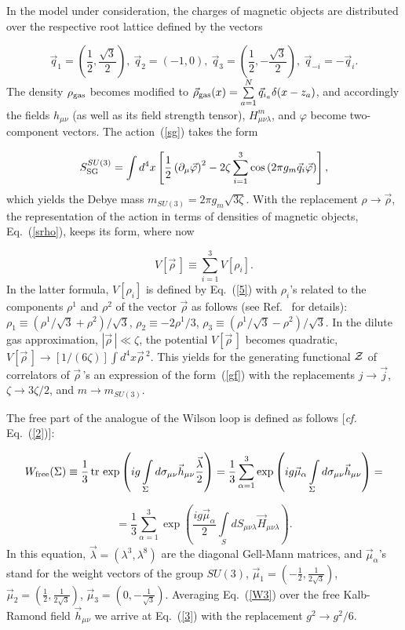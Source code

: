 \documentclass[a4paper,12pt]{article}
\begin{document}
In the model under consideration, the charges of magnetic objects are distributed over the respective root lattice 
defined by the vectors

$$\vec q_1=\left(\frac12,\frac{\sqrt{3}}{2}\right),~ 
\vec q_2=(-1,0),~
\vec q_3=\left(\frac12,-\frac{\sqrt{3}}{2}\right),~
\vec q_{-i}=-\vec q_i.$$
The density $\rho_{\rm gas}$ becomes modified to $\vec\rho_{\rm gas}(x)=\sum\limits_{a=1}^{N}\vec q_{i_a}\delta(x-z_a)$, and 
accordingly the fields $h_{\mu\nu}$ (as well as its field strength tensor),
$H_{\mu\nu\lambda}^m$, and $\varphi$ become two-component vectors. The action~(\ref{sg}) takes the form

\begin{equation}
\label{sg3}
S_{\rm SG}^{SU(3)}=\int d^4x\left[\frac12\left(\partial_\mu\vec\varphi\right)^2-2\zeta\sum\limits_{i=1}^{3}\cos\left(2\pi g_m
\vec q_i\vec\varphi\right)\right],
\end{equation}
which yields the Debye mass $m_{SU(3)}=2\pi g_m\sqrt{3\zeta}$. With the replacement $\rho\to\vec\rho$,
the representation of the action in terms of 
densities of magnetic objects, Eq.~(\ref{srho}), keeps its form, where now 

$$V[\vec\rho{\,}]\equiv\sum\limits_{i=1}^{3}V\left[\rho_i\right].$$
In the latter formula, $V\left[\rho_i\right]$ is defined by Eq.~(\ref{5}) with $\rho_i$'s related to the components $\rho^1$ and $\rho^2$
of the vector $\vec\rho$ as follows (see Ref.~\cite{su3} for details): 
$\rho_1\equiv\left(\rho^1/\sqrt{3}+\rho^2\right)/\sqrt{3}$, 
$\rho_2\equiv -2\rho^1/3$, $\rho_3\equiv
\left(\rho^1/\sqrt{3}-\rho^2\right)/\sqrt{3}$. In the dilute gas approximation, $|\vec\rho{\,}|\ll\zeta$, the potential $V[\vec\rho{\,}]$
becomes quadratic, 
$V[\vec\rho{\,}]\to[1/(6\zeta)]
\int d^4x\vec\rho{\,}^2$. This yields for the generating functional ${\cal Z}$ of correlators of $\vec\rho{\,}$'s an expression of the form~(\ref{gf})
with the replacements $j\to\vec j$, $\zeta\to3\zeta/2$, and $m\to m_{SU(3)}$. 

The free part of the analogue of the Wilson loop is defined as follows [{\it cf.} Eq.~(\ref{2})]:

$$W_{\rm free}(\Sigma)\equiv\frac13{\,}{\rm tr}{\,}\exp\left(ig\int\limits_{\Sigma}^{}d\sigma_{\mu\nu}\vec h_{\mu\nu}\frac{\vec\lambda}{2}\right)=
\frac13\sum\limits_{\alpha=1}^{3}\exp\left(ig\vec\mu_\alpha\int\limits_{\Sigma}^{}d\sigma_{\mu\nu}\vec h_{\mu\nu}\right)=$$

\begin{equation}
\label{W3}
=\frac13\sum\limits_{\alpha=1}^{3}\exp\left(\frac{ig\vec\mu_\alpha}{2}
\int\limits_{S}^{} dS_{\mu\nu\lambda}\vec H_{\mu\nu\lambda}\right).
\end{equation}
In this equation, $\vec\lambda=\left(\lambda^3,\lambda^8\right)$ are the diagonal Gell-Mann matrices, and 
$\vec\mu_\alpha$'s stand for the weight vectors of the group $SU(3)$, 
$\vec\mu_1=\left(
-\frac12,\frac{1}{2\sqrt{3}}\right)$, $\vec\mu_2=
\left(\frac12,\frac{1}{2\sqrt{3}}\right)$, $\vec\mu_3=
\left(0,-\frac{1}{\sqrt{3}}\right)$. Averaging Eq.~(\ref{W3}) over the free Kalb-Ramond field $\vec h_{\mu\nu}$ we arrive at Eq.~(\ref{3})
with the replacement $g^2\to g^2/6$.
\end{document}
